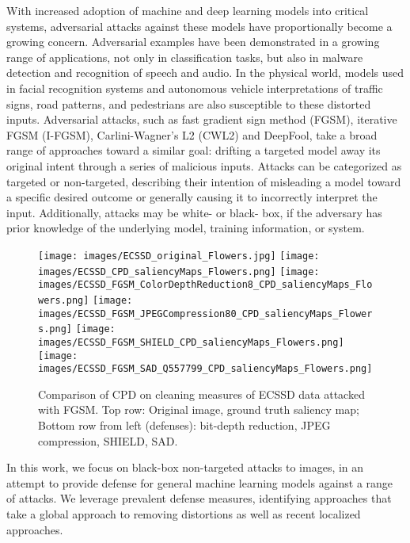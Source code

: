 \documentclass[10pt,twocolumn,letterpaper]{article}
\begin{document}
With increased adoption of machine and deep learning models into critical systems, adversarial attacks against these models have proportionally become a growing concern. 
Adversarial examples have been demonstrated in a growing range of applications, not only in classification tasks, but also in malware detection\cite{grosse2017adversarial} and recognition of speech and audio\cite{qin2019imperceptible}.
In the physical world, models used in facial recognition systems \cite{sharif2016accessorize} and autonomous vehicle interpretations of traffic signs, road patterns, and pedestrians \cite{kurakin2016adversarial} are also susceptible to these distorted inputs.
Adversarial attacks, such as fast gradient sign method (FGSM)\cite{FGSM}, iterative FGSM (I-FGSM)\cite{IFGSM}, Carlini-Wagner's L2 (CWL2)\cite{CWL2} and DeepFool\cite{deepfool}, take a broad range of approaches toward a similar goal: drifting a targeted model away its original intent through a series of malicious inputs\cite{athalye2018synthesizing}.
Attacks can be categorized as targeted or non-targeted, describing their intention of misleading a model toward a specific desired outcome or generally causing it to incorrectly interpret the input.
Additionally, attacks may be white- or black- box, if the adversary has prior knowledge of the underlying model, training information, or system.
\begin{figure}[hbt]
\centering
  \texttt{[image: images/ECSSD\_original\_Flowers.jpg]}
  \texttt{[image: images/ECSSD\_CPD\_saliencyMaps\_Flowers.png]}
  \texttt{[image: images/ECSSD\_FGSM\_ColorDepthReduction8\_CPD\_saliencyMaps\_Flowers.png]}
  \texttt{[image: images/ECSSD\_FGSM\_JPEGCompression80\_CPD\_saliencyMaps\_Flowers.png]}
  \texttt{[image: images/ECSSD\_FGSM\_SHIELD\_CPD\_saliencyMaps\_Flowers.png]}
  \texttt{[image: images/ECSSD\_FGSM\_SAD\_Q557799\_CPD\_saliencyMaps\_Flowers.png]}
  \caption{Comparison of CPD\cite{wu2019cascaded} on cleaning measures of ECSSD\cite{ECSSD} data attacked with FGSM\cite{FGSM}.
  Top row: Original image, ground truth saliency map;
  Bottom row from left (defenses): bit-depth reduction, JPEG compression, SHIELD\cite{das2018shield}, SAD.
  }
  \label{motivation}
\end{figure}
In this work, we focus on black-box non-targeted attacks to images, in an attempt to provide defense for general machine learning models against a range of attacks.
We leverage prevalent defense measures, identifying approaches that take a global approach to removing distortions as well as recent localized approaches.
\end{document}
